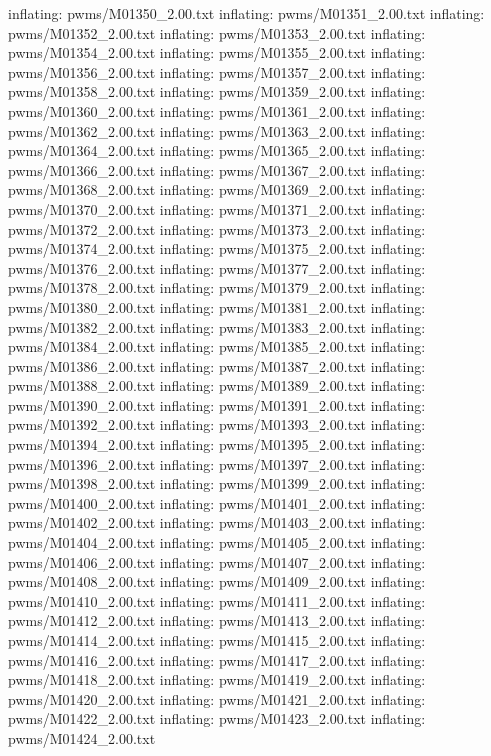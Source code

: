 \documentclass[letterpaper,10pt,english]{sphinxmanual}
\begin{document}
{\begin{sphinxVerbatim}[commandchars=\\\{\}]
  inflating: pwms/M01350\_2.00.txt
  inflating: pwms/M01351\_2.00.txt
  inflating: pwms/M01352\_2.00.txt
  inflating: pwms/M01353\_2.00.txt
  inflating: pwms/M01354\_2.00.txt
  inflating: pwms/M01355\_2.00.txt
  inflating: pwms/M01356\_2.00.txt
  inflating: pwms/M01357\_2.00.txt
  inflating: pwms/M01358\_2.00.txt
  inflating: pwms/M01359\_2.00.txt
  inflating: pwms/M01360\_2.00.txt
  inflating: pwms/M01361\_2.00.txt
  inflating: pwms/M01362\_2.00.txt
  inflating: pwms/M01363\_2.00.txt
  inflating: pwms/M01364\_2.00.txt
  inflating: pwms/M01365\_2.00.txt
  inflating: pwms/M01366\_2.00.txt
  inflating: pwms/M01367\_2.00.txt
  inflating: pwms/M01368\_2.00.txt
  inflating: pwms/M01369\_2.00.txt
  inflating: pwms/M01370\_2.00.txt
  inflating: pwms/M01371\_2.00.txt
  inflating: pwms/M01372\_2.00.txt
  inflating: pwms/M01373\_2.00.txt
  inflating: pwms/M01374\_2.00.txt
  inflating: pwms/M01375\_2.00.txt
  inflating: pwms/M01376\_2.00.txt
  inflating: pwms/M01377\_2.00.txt
  inflating: pwms/M01378\_2.00.txt
  inflating: pwms/M01379\_2.00.txt
  inflating: pwms/M01380\_2.00.txt
  inflating: pwms/M01381\_2.00.txt
  inflating: pwms/M01382\_2.00.txt
  inflating: pwms/M01383\_2.00.txt
  inflating: pwms/M01384\_2.00.txt
  inflating: pwms/M01385\_2.00.txt
  inflating: pwms/M01386\_2.00.txt
  inflating: pwms/M01387\_2.00.txt
  inflating: pwms/M01388\_2.00.txt
  inflating: pwms/M01389\_2.00.txt
  inflating: pwms/M01390\_2.00.txt
  inflating: pwms/M01391\_2.00.txt
  inflating: pwms/M01392\_2.00.txt
  inflating: pwms/M01393\_2.00.txt
  inflating: pwms/M01394\_2.00.txt
  inflating: pwms/M01395\_2.00.txt
  inflating: pwms/M01396\_2.00.txt
  inflating: pwms/M01397\_2.00.txt
  inflating: pwms/M01398\_2.00.txt
  inflating: pwms/M01399\_2.00.txt
  inflating: pwms/M01400\_2.00.txt
  inflating: pwms/M01401\_2.00.txt
  inflating: pwms/M01402\_2.00.txt
  inflating: pwms/M01403\_2.00.txt
  inflating: pwms/M01404\_2.00.txt
  inflating: pwms/M01405\_2.00.txt
  inflating: pwms/M01406\_2.00.txt
  inflating: pwms/M01407\_2.00.txt
  inflating: pwms/M01408\_2.00.txt
  inflating: pwms/M01409\_2.00.txt
  inflating: pwms/M01410\_2.00.txt
  inflating: pwms/M01411\_2.00.txt
  inflating: pwms/M01412\_2.00.txt
  inflating: pwms/M01413\_2.00.txt
  inflating: pwms/M01414\_2.00.txt
  inflating: pwms/M01415\_2.00.txt
  inflating: pwms/M01416\_2.00.txt
  inflating: pwms/M01417\_2.00.txt
  inflating: pwms/M01418\_2.00.txt
  inflating: pwms/M01419\_2.00.txt
  inflating: pwms/M01420\_2.00.txt
  inflating: pwms/M01421\_2.00.txt
  inflating: pwms/M01422\_2.00.txt
  inflating: pwms/M01423\_2.00.txt
  inflating: pwms/M01424\_2.00.txt

\end{sphinxVerbatim}}
\end{document}
